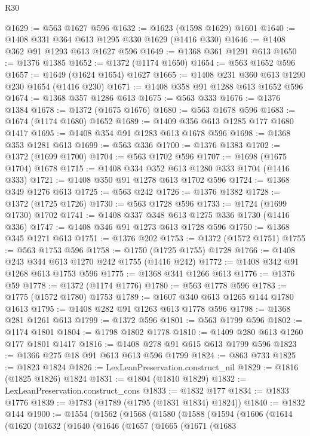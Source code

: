 \begin{lexlean}{R30}
\begin{coremodule}
@1629 := @563 @1627 @596
@1632 := @1623 (@1598 @1629) @1601
@1640 := @1408 @331 @364 @613 @1295 @330 @1629 (@1416 @330)
@1646 := @1408 @362 @91 @1293 @613 @1627 @596
@1649 := @1368 @361 @1291 @613
@1650 := @1376 @1385
@1652 := @1372 (@1174 @1650)
@1654 := @563 @1652 @596
@1657 := @1649 (@1624 @1654) @1627
@1665 := @1408 @231 @360 @613 @1290 @230 @1654 (@1416 @230)
@1671 := @1408 @358 @91 @1288 @613 @1652 @596
@1674 := @1368 @357 @1286 @613
@1675 := @563 @333
@1676 := @1376 @1384
@1678 := @1372 (@1675 @1676)
@1680 := @563 @1678 @596
@1683 := @1674 (@1174 @1680) @1652
@1689 := @1409 @356 @613 @1285 @177 @1680 @1417
@1695 := @1408 @354 @91 @1283 @613 @1678 @596
@1698 := @1368 @353 @1281 @613
@1699 := @563 @336
@1700 := @1376 @1383
@1702 := @1372 (@1699 @1700)
@1704 := @563 @1702 @596
@1707 := @1698 (@1675 @1704) @1678
@1715 := @1408 @334 @352 @613 @1280 @333 @1704 (@1416 @333)
@1721 := @1408 @350 @91 @1278 @613 @1702 @596
@1724 := @1368 @349 @1276 @613
@1725 := @563 @242
@1726 := @1376 @1382
@1728 := @1372 (@1725 @1726)
@1730 := @563 @1728 @596
@1733 := @1724 (@1699 @1730) @1702
@1741 := @1408 @337 @348 @613 @1275 @336 @1730 (@1416 @336)
@1747 := @1408 @346 @91 @1273 @613 @1728 @596
@1750 := @1368 @345 @1271 @613
@1751 := @1376 @202
@1753 := @1372 (@1572 @1751)
@1755 := @563 @1753 @596
@1758 := @1750 (@1725 @1755) @1728
@1766 := @1408 @243 @344 @613 @1270 @242 @1755 (@1416 @242)
@1772 := @1408 @342 @91 @1268 @613 @1753 @596
@1775 := @1368 @341 @1266 @613
@1776 := @1376 @59
@1778 := @1372 (@1174 @1776)
@1780 := @563 @1778 @596
@1783 := @1775 (@1572 @1780) @1753
@1789 := @1607 @340 @613 @1265 @144 @1780 @1613
@1795 := @1408 @282 @91 @1263 @613 @1778 @596
@1798 := @1368 @281 @1261 @613
@1799 := @1372 @596
@1801 := @563 @1799 @596
@1802 := @1174 @1801
@1804 := @1798 @1802 @1778
@1810 := @1409 @280 @613 @1260 @177 @1801 @1417
@1816 := @1408 @278 @91 @615 @613 @1799 @596
@1823 := @1366 @275 @18 @91 @613 @613 @596 @1799
@1824 := @863 @733
@1825 := @1823 @1824
@1826 := LexLeanPreservation.construct_nil
@1829 := @1816 (@1825 @1826) @1824
@1831 := @1804 (@1810 @1829)
@1832 := LexLeanPreservation.construct_cons
@1833 := @1832 @177
@1834 := @1833 @1776
@1839 := @1783 (@1789 (@1795 (@1831 @1834) @1824))
@1840 := @1832 @144
@1900 := @1554
    (@1562
      (@1568
        (@1580
          (@1588
            (@1594
              (@1606
                (@1614
                  (@1620
                    (@1632
                      (@1640
                        (@1646
                          (@1657
                            (@1665
                              (@1671
                                (@1683

\end{coremodule}
\end{lexlean}
